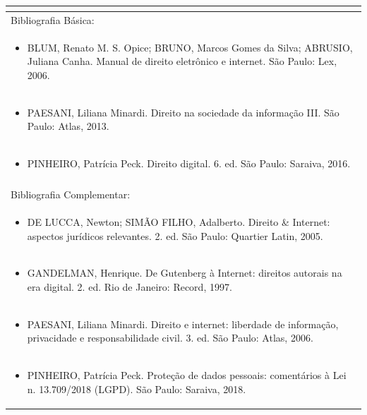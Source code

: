 \documentclass[11pt]{article}
\begin{document}
\begin{center}
\begin{longtable}{|p{4cm}|p{4cm}|p{4cm}|p{4cm}|}
\multicolumn{4}{|p{\dimexpr 16cm + 6\tabcolsep\relax}|}{}\\
\hline
\multicolumn{4}{|p{16cm}|}{Bibliografia Básica:}\\*
\multicolumn{4}{|p{\dimexpr 16cm + 6\tabcolsep\relax}|}{\begin{itemize}\item BLUM, Renato M. S. Opice; BRUNO, Marcos Gomes da Silva; ABRUSIO, Juliana Canha. Manual de direito eletrônico e internet. São Paulo: Lex, 2006.\end{itemize}}\\
\multicolumn{4}{|p{\dimexpr 16cm + 6\tabcolsep\relax}|}{\begin{itemize}\item PAESANI, Liliana Minardi. Direito na sociedade da informação III. São Paulo: Atlas, 2013.\end{itemize}}\\
\multicolumn{4}{|p{\dimexpr 16cm + 6\tabcolsep\relax}|}{\begin{itemize}\item PINHEIRO, Patrícia Peck. Direito digital. 6. ed. São Paulo: Saraiva, 2016.\end{itemize}}\\
\multicolumn{4}{|p{16cm}|}{}\\
\hline
\multicolumn{4}{|p{16cm}|}{Bibliografia Complementar:}\\*
\multicolumn{4}{|p{\dimexpr 16cm + 6\tabcolsep\relax}|}{\begin{itemize}\item DE LUCCA, Newton; SIMÃO FILHO, Adalberto. Direito \& Internet: aspectos jurídicos relevantes. 2. ed. São Paulo: Quartier Latin, 2005.\end{itemize}}\\
\multicolumn{4}{|p{\dimexpr 16cm + 6\tabcolsep\relax}|}{\begin{itemize}\item GANDELMAN, Henrique. De Gutenberg à Internet: direitos autorais na era digital. 2. ed. Rio de Janeiro: Record, 1997.\end{itemize}}\\
\multicolumn{4}{|p{\dimexpr 16cm + 6\tabcolsep\relax}|}{\begin{itemize}\item PAESANI, Liliana Minardi. Direito e internet: liberdade de informação, privacidade e responsabilidade civil. 3. ed. São Paulo: Atlas, 2006.\end{itemize}}\\
\multicolumn{4}{|p{\dimexpr 16cm + 6\tabcolsep\relax}|}{\begin{itemize}\item PINHEIRO, Patrícia Peck. Proteção de dados pessoais: comentários à Lei n. 13.709/2018 (LGPD). São Paulo: Saraiva, 2018.\end{itemize}}\\

\end{longtable}
\end{center}
\end{document}
